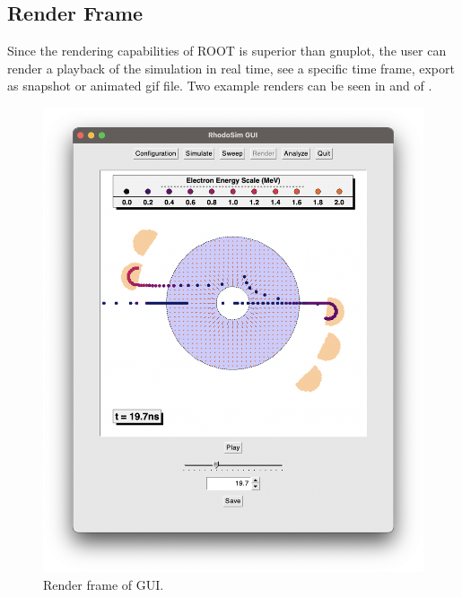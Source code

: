 \documentclass[a4paper,oneside,12pt]{report}
\numberwithin{equation}{chapter}
\begin{document}
{\clearpage
\subsection{Render Frame}
Since the rendering capabilities of ROOT is superior than gnuplot, the user can render a playback of the simulation in real time, 
see a specific time frame, export as snapshot or animated gif file.
Two example renders can be seen in  and  of .
\vspace{10pt}
\begin{figure}[h]
    \centering
    \includegraphics[width=0.85\linewidth]{./figures/rhodoSim/GUI_render_frame_5.png}
    \caption{Render frame of GUI.}
    \label{fig:gui_render_1}
\end{figure}

}
\end{document}
